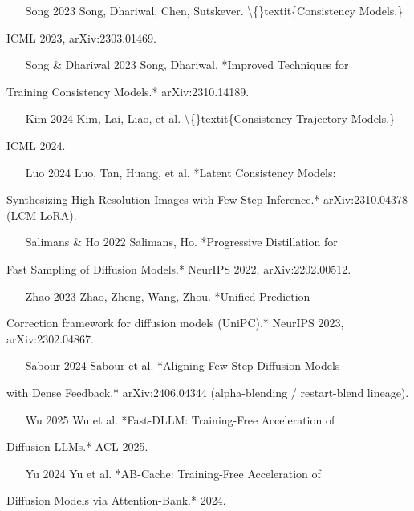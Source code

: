 \documentclass[preprint,3p,times,twocolumn]{elsarticle}
\begin{document}
\begin{itemize}
\item [Song 2023] Song, Dhariwal, Chen, Sutskever. \textbackslash\{\}textit\{Consistency Models.\}
\end{itemize}
ICML 2023, arXiv:2303.01469.

\begin{itemize}
\item [Song \& Dhariwal 2023] Song, Dhariwal. *Improved Techniques for
\end{itemize}
Training Consistency Models.* arXiv:2310.14189.

\begin{itemize}
\item [Kim 2024] Kim, Lai, Liao, et al. \textbackslash\{\}textit\{Consistency Trajectory Models.\}
\end{itemize}
ICML 2024.

\begin{itemize}
\item [Luo 2024] Luo, Tan, Huang, et al. *Latent Consistency Models:
\end{itemize}
Synthesizing High-Resolution Images with Few-Step Inference.* arXiv:2310.04378 (LCM-LoRA).

\begin{itemize}
\item [Salimans \& Ho 2022] Salimans, Ho. *Progressive Distillation for
\end{itemize}
Fast Sampling of Diffusion Models.* NeurIPS 2022, arXiv:2202.00512.

\begin{itemize}
\item [Zhao 2023] Zhao, Zheng, Wang, Zhou. *Unified Prediction
\end{itemize}
Correction framework for diffusion models (UniPC).* NeurIPS 2023, arXiv:2302.04867.

\begin{itemize}
\item [Sabour 2024] Sabour et al. *Aligning Few-Step Diffusion Models
\end{itemize}
with Dense Feedback.* arXiv:2406.04344 (alpha-blending / restart-blend lineage).

\begin{itemize}
\item [Wu 2025] Wu et al. *Fast-DLLM: Training-Free Acceleration of
\end{itemize}
Diffusion LLMs.* ACL 2025.

\begin{itemize}
\item [Yu 2024] Yu et al. *AB-Cache: Training-Free Acceleration of
\end{itemize}
Diffusion Models via Attention-Bank.* 2024.
\end{document}
